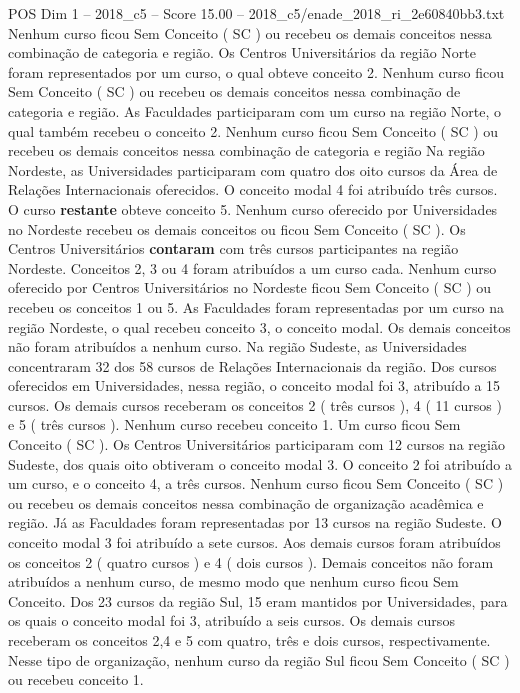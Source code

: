 \begin{textsample}{POS Dim 1 – 2018\_c5 – Score 15.00 – 2018\_c5/enade\_2018\_ri\_2e60840bb3.txt}
Nenhum curso ficou Sem Conceito ( SC ) ou recebeu os demais conceitos nessa combinação de categoria e região.
Os Centros Universitários da região Norte foram representados por um curso, o qual obteve conceito 2.
Nenhum curso ficou Sem Conceito ( SC ) ou recebeu os demais conceitos nessa combinação de categoria e região.
As Faculdades participaram com um curso na região Norte, o qual também recebeu o conceito 2.
Nenhum curso ficou Sem Conceito ( SC ) ou recebeu os demais conceitos nessa combinação de categoria e região Na região Nordeste, as Universidades participaram com quatro dos oito cursos da Área de Relações Internacionais oferecidos.
O conceito modal 4 foi atribuído três cursos.
O curso \textbf{restante} obteve conceito 5.
Nenhum curso oferecido por Universidades no Nordeste recebeu os demais conceitos ou ficou Sem Conceito ( SC ).
Os Centros Universitários \textbf{contaram} com três cursos participantes na região Nordeste.
Conceitos 2, 3 ou 4 foram atribuídos a um curso cada.
Nenhum curso oferecido por Centros Universitários no Nordeste ficou Sem Conceito ( SC ) ou recebeu os conceitos 1 ou 5.
As Faculdades foram representadas por um curso na região Nordeste, o qual recebeu conceito 3, o conceito modal.
Os demais conceitos não foram atribuídos a nenhum curso.
Na região Sudeste, as Universidades concentraram 32 dos 58 cursos de Relações Internacionais da região.
Dos cursos oferecidos em Universidades, nessa região, o conceito modal foi 3, atribuído a 15 cursos.
Os demais cursos receberam os conceitos 2 ( três cursos ), 4 ( 11 cursos ) e 5 ( três cursos ).
Nenhum curso recebeu conceito 1.
Um curso ficou Sem Conceito ( SC ).
Os Centros Universitários participaram com 12 cursos na região Sudeste, dos quais oito obtiveram o conceito modal 3.
O conceito 2 foi atribuído a um curso, e o conceito 4, a três cursos.
Nenhum curso ficou Sem Conceito ( SC ) ou recebeu os demais conceitos nessa combinação de organização acadêmica e região.
Já as Faculdades foram representadas por 13 cursos na região Sudeste.
O conceito modal 3 foi atribuído a sete cursos.
Aos demais cursos foram atribuídos os conceitos 2 ( quatro cursos ) e 4 ( dois cursos ).
Demais conceitos não foram atribuídos a nenhum curso, de mesmo modo que nenhum curso ficou Sem Conceito.
Dos 23 cursos da região Sul, 15 eram mantidos por Universidades, para os quais o conceito modal foi 3, atribuído a seis cursos.
Os demais cursos receberam os conceitos 2,4 e 5 com quatro, três e dois cursos, respectivamente.
Nesse tipo de organização, nenhum curso da região Sul ficou Sem Conceito ( SC ) ou recebeu conceito 1.

\end{textsample}
